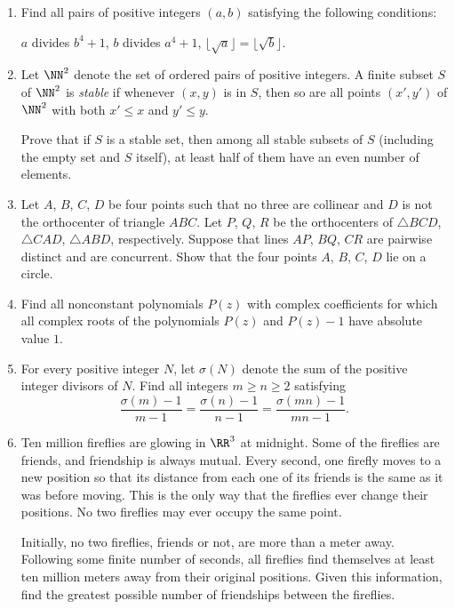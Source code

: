 \documentclass[11pt]{scrartcl}
\begin{document}
\begin{enumerate}[\bfseries 1.]
\item %
Find all pairs of positive integers $(a, b)$ satisfying
the following conditions:
\begin{enumerate}[(i)]
  \ii $a$ divides $b^4+1$,
  \ii $b$ divides $a^4+1$,
  \ii $\lfloor \sqrt{a} \rfloor = \lfloor \sqrt{b} \rfloor$.
\end{enumerate}

\item %
Let $\NN^2$ denote the set of ordered pairs of positive integers.
A finite subset $S$ of $\NN^2$ is \emph{stable}
if whenever $(x,y)$ is in $S$,
then so are all points $(x',y')$ of $\NN^2$
with both $x' \leq x$ and $y' \leq y$.

Prove that if $S$ is a stable set,
then among all stable subsets of $S$
(including the empty set and $S$ itself),
at least half of them have an even number of elements.

\item %
Let $A$, $B$, $C$, $D$ be four points
such that no three are collinear
and $D$ is not the orthocenter of triangle $ABC$.
Let $P$, $Q$, $R$ be the orthocenters of
$\triangle BCD$, $\triangle CAD$, $\triangle ABD$, respectively.
Suppose that lines $AP$, $BQ$, $CR$ are pairwise distinct
and are concurrent.
Show that the four points $A$, $B$, $C$, $D$ lie on a circle.

\item %
Find all nonconstant polynomials $P(z)$ with complex coefficients
for which all complex roots of the polynomials
$P(z)$ and $P(z)-1$ have absolute value $1$.

\item %
For every positive integer $N$,
let $\sigma(N)$ denote the sum of the positive integer divisors of $N$.
Find all integers $m \ge n \ge 2$ satisfying
\[ \frac{\sigma(m)-1}{m-1}
  = \frac{\sigma(n)-1}{n-1} = \frac{\sigma(mn)-1}{mn-1}.  \]

\item %
Ten million fireflies are glowing in $\RR^3$ at midnight.
Some of the fireflies are friends, and friendship is always mutual.
Every second, one firefly moves to a new position
so that its distance from each one of its friends is the same
as it was before moving.
This is the only way that the fireflies ever change their positions.
No two fireflies may ever occupy the same point.

Initially, no two fireflies, friends or not, are more than a meter away.
Following some finite number of seconds,
all fireflies find themselves at least ten million meters
away from their original positions.
Given this information,
find the greatest possible number of friendships between the fireflies.

\end{enumerate}
\pagebreak
\end{document}
